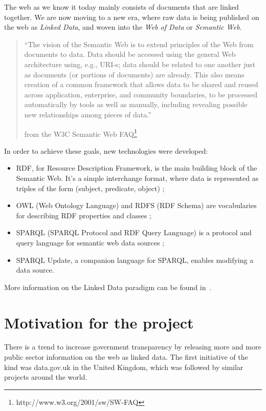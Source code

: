 \documentclass[a4paper,11pt]{report}
\begin{document}
The web as we know it today mainly consists of documents that are linked together. We are now moving to a new era, where raw data is being published on the web as \emph{Linked Data}, and woven into the \emph{Web of Data} or \emph{Semantic Web}. 
\begin{quotation}
``The vision of the Semantic Web is to extend principles of the Web from documents to data. Data should be accessed using the general Web architecture using, e.g., URI-s; data should be related to one another just as documents (or portions of documents) are already. This also means creation of a common framework that allows data to be shared and reused across application, enterprise, and community boundaries, to be processed automatically by tools as well as manually, including revealing possible new relationships among pieces of data.''
\begin{flushright}
from the W3C Semantic Web FAQ\footnote{http://www.w3.org/2001/sw/SW-FAQ}
\end{flushright}
\end{quotation}
In order to achieve these goals, new technologies were developed:
\begin{itemize}
\item RDF, for Resource Description Framework, is the main building block of the Semantic Web. It's a simple interchange format, where data is represented as triples of the form (subject, predicate, object) ;
\item OWL (Web Ontology Language) and RDFS (RDF Schema) are vocabularies for describing RDF properties and classes ;
\item SPARQL (SPARQL Protocol and RDF Query Language) is a protocol and query language for semantic web data sources ;
\item SPARQL Update, a companion language for SPARQL, enables modifying a data source. %
\end{itemize}

More information on the Linked Data paradigm can be found in~\cite{Heath2011}. 

\section*{Motivation for the project}
There is a trend to increase government transparency by releasing more and more public sector information on the web as linked data. The first initiative of the kind was data.gov.uk in the United Kingdom, which was followed by similar projects around the world. 
\end{document}
